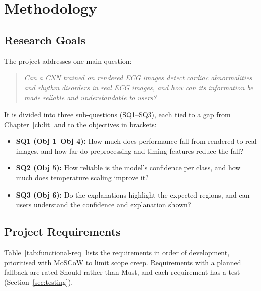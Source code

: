 \chapter{Methodology}
\label{ch:method}

\section{Research Goals}
\label{sec:goals}
The project addresses one main question:
\begin{quote}
\emph{Can a CNN trained on rendered ECG images detect cardiac abnormalities and rhythm disorders in real ECG images, and how can its information be made reliable and understandable to users?}
\end{quote}
It is divided into three sub-questions (SQ1--SQ3), each tied to a gap from Chapter~\ref{ch:lit} and to the objectives in brackets:
\begin{itemize}
  \item \textbf{SQ1 (Obj 1--Obj 4):} How much does performance fall from rendered to real images, and how far do preprocessing and timing features reduce the fall?
  \item \textbf{SQ2 (Obj 5):} How reliable is the model's confidence per class, and how much does temperature scaling improve it?
  \item \textbf{SQ3 (Obj 6):} Do the explanations highlight the expected regions, and can users understand the confidence and explanation shown?
\end{itemize}

\section{Project Requirements}
\label{sec:requirements}
Table~\ref{tab:functional-req} lists the requirements in order of development, prioritised with MoSCoW to limit scope creep. Requirements with a planned fallback are rated Should rather than Must, and each requirement has a test (Section~\ref{sec:testing}).

